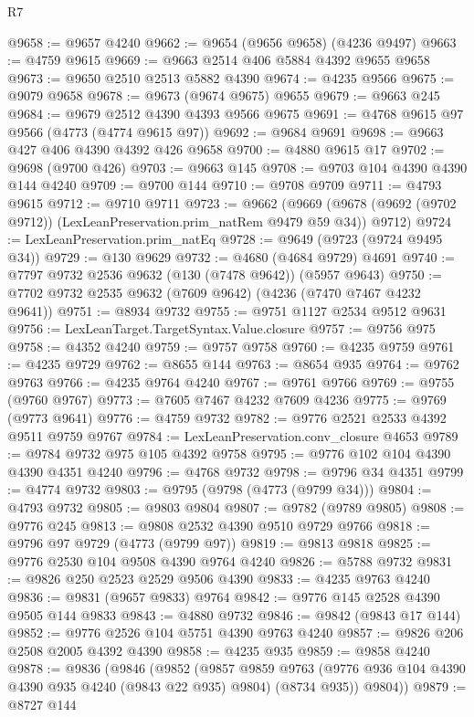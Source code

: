 \begin{lexlean}{R7}
\begin{coremodule}
@9658 := @9657 @4240
@9662 := @9654 (@9656 @9658) (@4236 @9497)
@9663 := @4759 @9615
@9669 := @9663 @2514 @406 @5884 @4392 @9655 @9658
@9673 := @9650 @2510 @2513 @5882 @4390
@9674 := @4235 @9566
@9675 := @9079 @9658
@9678 := @9673 (@9674 @9675) @9655
@9679 := @9663 @245
@9684 := @9679 @2512 @4390 @4393 @9566 @9675
@9691 := @4768 @9615 @97 @9566 (@4773 (@4774 @9615 @97))
@9692 := @9684 @9691
@9698 := @9663 @427 @406 @4390 @4392 @426 @9658
@9700 := @4880 @9615 @17
@9702 := @9698 (@9700 @426)
@9703 := @9663 @145
@9708 := @9703 @104 @4390 @4390 @144 @4240
@9709 := @9700 @144
@9710 := @9708 @9709
@9711 := @4793 @9615
@9712 := @9710 @9711
@9723 := @9662
    (@9669 (@9678 (@9692 (@9702 @9712)) (LexLeanPreservation.prim_natRem @9479 @59 @34)) @9712)
@9724 := LexLeanPreservation.prim_natEq
@9728 := @9649 (@9723 (@9724 @9495 @34))
@9729 := @130 @9629
@9732 := @4680 (@4684 @9729) @4691
@9740 := @7797 @9732 @2536 @9632 (@130 (@7478 @9642)) (@5957 @9643)
@9750 := @7702 @9732 @2535 @9632 (@7609 @9642) (@4236 (@7470 @7467 @4232 @9641))
@9751 := @8934 @9732
@9755 := @9751 @1127 @2534 @9512 @9631
@9756 := LexLeanTarget.TargetSyntax.Value.closure
@9757 := @9756 @975
@9758 := @4352 @4240
@9759 := @9757 @9758
@9760 := @4235 @9759
@9761 := @4235 @9729
@9762 := @8655 @144
@9763 := @8654 @935
@9764 := @9762 @9763
@9766 := @4235 @9764 @4240
@9767 := @9761 @9766
@9769 := @9755 (@9760 @9767)
@9773 := @7605 @7467 @4232 @7609 @4236
@9775 := @9769 (@9773 @9641)
@9776 := @4759 @9732
@9782 := @9776 @2521 @2533 @4392 @9511 @9759 @9767
@9784 := LexLeanPreservation.conv_closure @4653
@9789 := @9784 @9732 @975 @105 @4392 @9758
@9795 := @9776 @102 @104 @4390 @4390 @4351 @4240
@9796 := @4768 @9732
@9798 := @9796 @34 @4351
@9799 := @4774 @9732
@9803 := @9795 (@9798 (@4773 (@9799 @34)))
@9804 := @4793 @9732
@9805 := @9803 @9804
@9807 := @9782 (@9789 @9805)
@9808 := @9776 @245
@9813 := @9808 @2532 @4390 @9510 @9729 @9766
@9818 := @9796 @97 @9729 (@4773 (@9799 @97))
@9819 := @9813 @9818
@9825 := @9776 @2530 @104 @9508 @4390 @9764 @4240
@9826 := @5788 @9732
@9831 := @9826 @250 @2523 @2529 @9506 @4390
@9833 := @4235 @9763 @4240
@9836 := @9831 (@9657 @9833) @9764
@9842 := @9776 @145 @2528 @4390 @9505 @144 @9833
@9843 := @4880 @9732
@9846 := @9842 (@9843 @17 @144)
@9852 := @9776 @2526 @104 @5751 @4390 @9763 @4240
@9857 := @9826 @206 @2508 @2005 @4392 @4390
@9858 := @4235 @935
@9859 := @9858 @4240
@9878 := @9836
    (@9846
      (@9852
        (@9857
          @9859
          @9763
          (@9776 @936 @104 @4390 @4390 @935 @4240 (@9843 @22 @935) @9804)
          (@8734 @935))
        @9804))
@9879 := @8727 @144

\end{coremodule}
\end{lexlean}
